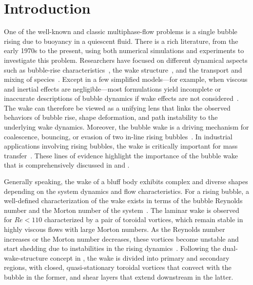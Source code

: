 \documentclass[aps,prfluids,reprint,nofootinbib,onecolumn,groupedaddress,showkeys]{revtex4-2}
\begin{document}
	\section{Introduction}
	\label{Introduction}
	
	One of the well-known and classic multiphase-flow problems is a single bubble rising due to buoyancy in a quiescent fluid. There is a rich literature, from the early 1970s to the present, using both numerical simulations and experiments to investigate this problem. Researchers have focused on different dynamical aspects such as bubble-rise characteristics~\cite{clift1978}, the wake structure~\cite{Bhaga1981,Lozano2016}, and the transport and mixing of species~\cite{Calderbank1970,Brignell1974,Zun2012,siow2025}. Except in a few simplified models—for example, when viscous and inertial effects are negligible—most formulations yield incomplete or inaccurate descriptions of bubble dynamics if wake effects are not considered~\cite{Liang1990}. The wake can therefore be viewed as a unifying lens that links the observed behaviors of bubble rise, shape deformation, and path instability to the underlying wake dynamics. Moreover, the bubble wake is a driving mechanism for coalescence, bouncing, or evasion of two in-line rising bubbles~\cite{Liao2010}. In industrial applications involving rising bubbles, the wake is critically important for mass transfer~\cite{Jimenez2013}. These lines of evidence highlight the importance of the bubble wake that is comprehensively discussed in \cite{Liang1990} and \cite{clift1978}.
	
	Generally speaking, the wake of a bluff body exhibits complex and diverse shapes depending on the system dynamics and flow characteristics. For a rising bubble, a well-defined characterization of the wake exists in terms of the bubble Reynolds number and the Morton number of the system~\cite{clift1978}. The laminar wake is observed for $Re<110$ characterized by a pair of toroidal vortices, which remain stable in highly viscous flows with large Morton numbers. As the Reynolds number increases or the Morton number decreases, these vortices become unstable and start shedding due to instabilities in the rising dynamics~\cite{Coppus1977,Tripathi2015}. Following the dual-wake-structure concept in \citet{Liang1990}, the wake is divided into primary and secondary regions, with closed, quasi-stationary toroidal vortices that convect with the bubble in the former, and shear layers that extend downstream in the latter. 
	
\end{document}
